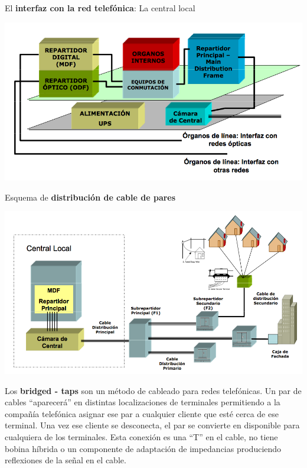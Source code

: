\documentclass[10pt,portrait, twocolumn]{article}
\makeatletter
\renewcommand{\subsubsection}{\@startsection{subsubsection}{3}{0mm}%
                                {-1ex plus -.5ex minus -.2ex}%
                                {1ex plus .2ex}%
                                {\normalfont\small\bfseries}}
\makeatother
\begin{document}
El \textbf{interfaz con la red telefónica}: La central local

	\begin{center}
		\includegraphics[scale=0.2]{images/CentralLocal}
	\end{center}

Esquema de \textbf{distribución de cable de pares}

	\begin{center}
		\includegraphics[scale=0.2]{images/Distribucion}
	\end{center}	


Los \textbf{bridged - taps} son un método de cableado para redes telefónicas. Un par de cables ``aparecerá'' en distintas localizaciones de terminales permitiendo a la compañía telefónica asignar ese par a cualquier cliente que esté cerca de ese terminal. Una vez ese cliente se desconecta, el par se convierte en disponible para cualquiera de los terminales. Esta conexión es una ``T'' en el cable, no tiene bobina híbrida o un componente de adaptación de impedancias produciendo reflexiones de la señal en el cable.
\end{document}
